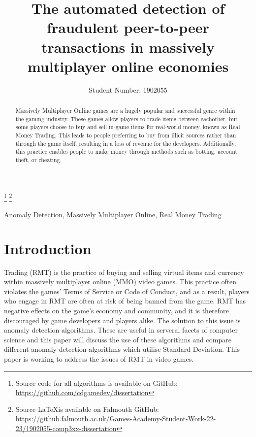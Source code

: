 \documentclass[journal]{IEEEtran}
\begin{document}
\title{The automated detection of fraudulent peer-to-peer transactions in massively multiplayer online economies}
\author{Student Number: 1902055}

\maketitle
\footnote{Source code for all algorithms is available on GitHub: \url{https://github.com/cdgamedev/dissertation}}
\footnote{Source \LaTeX is available on Falmouth GitHub: \url{https://github.falmouth.ac.uk/Games-Academy-Student-Work-22-23/1902055-comp3xx-dissertation}}

\begin{abstract}
Massively Multiplayer Online games are a hugely popular and successful genre within the gaming industry. These games allow players to trade items between eachother, but some players choose to buy and sell in-game items for real-world money, known as Real Money Trading. This leads to people preferring to buy from illicit sources rather than through the game itself, resulting in a loss of revenue for the developers. Additionally, this practice enables people to make money through methods such as botting, account theft, or cheating.
\end{abstract}

\begin{IEEEkeywords}
Anomaly Detection, Massively Multiplayer Online, Real Money Trading
\end{IEEEkeywords}

\section{Introduction}
 Trading (RMT) is the practice of buying and selling virtual items and currency within massively multiplayer online (MMO) video games. This practice often violates the games' Terms of Service or Code of Conduct\cite{AmazonGamesCOC}\cite{SquareEnixCOC}, and as a result, players who engage in RMT are often at risk of being banned from the game. RMT has negative effects on the game's economy and community, and it is therefore discouraged by game developers and players alike. The solution to this issue is anomaly detection algorithms. These are useful in serveral facets of computer science and this paper will discuss the use of these algorithms and compare different anomaly detection algorithms which utilise Standard Deviation. This paper is working to address the issues of RMT in video games.
\end{document}

